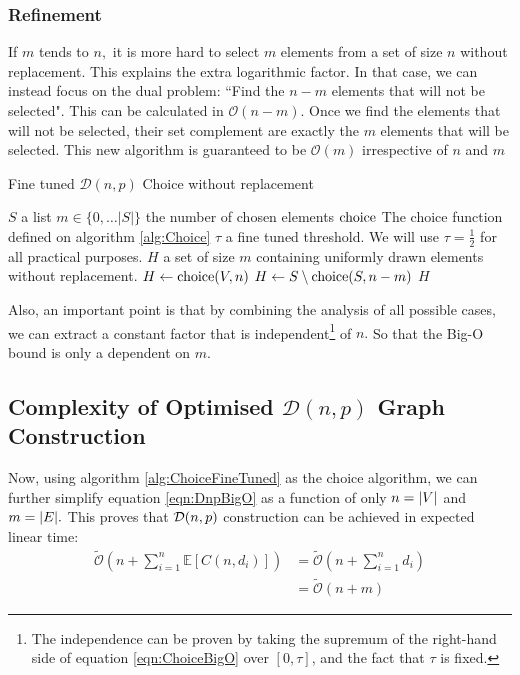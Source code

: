 \subsubsection{Refinement}
If $m$ tends to $n,$ it is more hard to select $m$ elements from a set of size $n$ without replacement. This explains the extra logarithmic factor.
\newline In that case, we can instead focus on the dual problem: ``Find the $n-m$ elements that will not be selected". This can be calculated in $\mathcal{O}(n-m).$
\newline Once we find the elements that will not be selected, their set complement are exactly the $m$ elements that will be selected. This new algorithm is guaranteed to be $\mathcal{O}(m)$ irrespective of $n$ and $m$
\begin{algorithm}
	\caption{Fine tuned $\mathcal{D}(n,p)$ Choice without replacement }\label{alg:ChoiceFineTuned}
	\begin{algorithmic}
		\Require $S$ a list
		\Require $m\in\{0,\dots \lvert S \rvert\}$ the number of chosen elements
		\Require $\operatorname{choice}$ The choice function defined on algorithm \ref{alg:Choice}
		\Require $\tau$ a fine tuned threshold. We will use $\tau=\frac{1}{2}$ for all practical purposes.
		\Ensure $H$ a set of size $m$ containing uniformly drawn elements without replacement. 
			\State $H\leftarrow \operatorname{choice}(V,n)$
		\Else
			\State $H\leftarrow S\setminus \operatorname{choice}(S,n-m)$
		\EndIf
		\State \Return $H$
	\end{algorithmic}
\end{algorithm}
\FloatBarrier
Also, an important point is that by combining the analysis of all possible cases, we can extract a constant factor that is independent\footnote{The independence can be proven by taking the supremum of the right-hand side of equation \eqref{eqn:ChoiceBigO} over $[0,\tau]$, and the fact that $\tau$ is fixed.} of $n.$ So that the Big-O bound is only a dependent on $m$.
\subsection{Complexity of Optimised $\mathcal{D}(n,p)$ Graph Construction}
Now, using algorithm \ref{alg:ChoiceFineTuned} as the choice algorithm, we can further simplify equation \eqref{eqn:DnpBigO} as a function of only $n=\lvert V\rvert$ and $m=\lvert E\rvert.$
\newline This proves that $\mathcal{D}(n,p)$ construction can be achieved in expected linear time:
\begin{align*}
	\tilde{\mathcal{O}}\left(n+\sum_{i=1}^n\mathbb{E}[C(n,d_i)]\right)  &= \tilde{\mathcal{O}}\left(n+\sum_{i=1}^nd_i\right) \\
	&=\tilde{\mathcal{O}}\left(n+m\right)
\end{align*}

